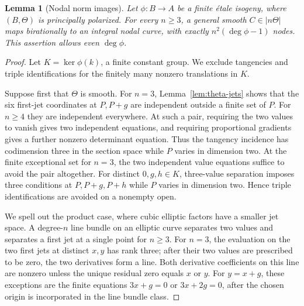 \documentclass[11pt]{article}
\newtheorem{lemma}[theorem]{Lemma}
\theoremstyle{definition}\newtheorem{definition}[theorem]{Definition}
\theoremstyle{remark}\newtheorem{remark}[theorem]{Remark}
\begin{document}
\begin{lemma}[Nodal norm images]\label{lem:norm-nodes}
Let $\phi:B\to A$ be a finite \'etale isogeny, where $(B,\Theta)$ is principally polarized. For every $n\ge3$, a general smooth $C\in|n\Theta|$ maps birationally to an integral nodal curve, with exactly $n^2(\deg\phi-1)$ nodes. This assertion allows even $\deg\phi$.
\end{lemma}
\begin{proof}
Let $K=\ker\phi(k)$, a finite constant group. We exclude tangencies and triple identifications for the finitely many nonzero translations in $K$.

Suppose first that $\Theta$ is smooth. For $n=3$, Lemma~\ref{lem:theta-jets} shows that the six first-jet coordinates at $P,P+g$ are independent outside a finite set of $P$. For $n\ge4$ they are independent everywhere. At such a pair, requiring the two values to vanish gives two independent equations, and requiring proportional gradients gives a further nonzero determinant equation. Thus the tangency incidence has codimension three in the section space while $P$ varies in dimension two. At the finite exceptional set for $n=3$, the two independent value equations suffice to avoid the pair altogether. For distinct $0,g,h\in K$, three-value separation imposes three conditions at $P,P+g,P+h$ while $P$ varies in dimension two. Hence triple identifications are avoided on a nonempty open.

We spell out the product case, where cubic elliptic factors have a smaller jet space. A degree-$n$ line bundle on an elliptic curve separates two values and separates a first jet at a single point for $n\ge3$. For $n=3$, the evaluation on the two first jets at distinct $x,y$ has rank three; after their two values are prescribed to be zero, the two derivatives form a line. Both derivative coefficients on this line are nonzero unless the unique residual zero equals $x$ or $y$. For $y=x+g$, these exceptions are the finite equations $3x+g=0$ or $3x+2g=0$, after the chosen origin is incorporated in the line bundle class.


\end{proof}
\end{document}
